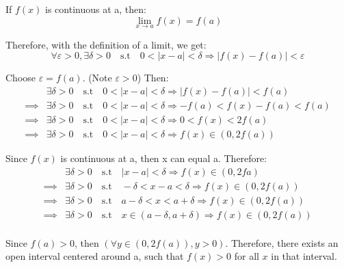 \documentclass[]{article}
\begin{document}
If $f(x)$ is continuous at a, then:
\[
    \lim_{x\to a} f(x) = f(a)
\]

Therefore, with the definition of a limit, we get:
\[
    \forall\varepsilon>0, \exists \delta > 0 \quad \text{s.t} \quad 0 < |x-a| < \delta \Longrightarrow |f(x) - f(a)| < \varepsilon
\]

Choose $\varepsilon = f(a)$. (Note $\varepsilon > 0$) Then:
\begin{align*}
    &\exists \delta > 0 \quad \text{s.t} \quad 0 < |x-a| < \delta \Longrightarrow |f(x) - f(a)| < f(a) \\
    \implies &\exists \delta > 0 \quad \text{s.t} \quad 0 < |x-a| < \delta \Longrightarrow -f(a) < f(x) - f(a) < f(a) \\
    \implies &\exists \delta > 0 \quad \text{s.t} \quad 0 < |x-a| < \delta \Longrightarrow 0 < f(x) < 2f(a) \\
    \implies &\exists \delta > 0 \quad \text{s.t} \quad 0 < |x-a| < \delta \Rightarrow f(x) \in (0, 2f(a))
\end{align*}

Since $f(x)$ is continuous at a, then x can equal a. Therefore:
\begin{align*}
    &\exists \delta > 0 \quad \text{s.t} \quad |x-a| < \delta \Longrightarrow f(x) \in (0, 2fa) \\
    \implies &\exists \delta > 0 \quad \text{s.t} \quad -\delta < x-a < \delta \Longrightarrow f(x) \in (0, 2f(a)) \\
    \implies &\exists \delta > 0 \quad \text{s.t} \quad a-\delta < x < a+\delta \Longrightarrow f(x) \in (0, 2f(a)) \\
    \implies &\exists \delta > 0 \quad \text{s.t} \quad x \in (a - \delta, a + \delta) \Longrightarrow f(x) \in (0, 2f(a)) \\
\end{align*}

Since $f(a) > 0$, then $(\forall y \in (0, 2f(a)), y > 0)$. Therefore, there exists an open interval centered around a, such that
$f(x) > 0$ for all $x$ in that interval.
\end{document}
